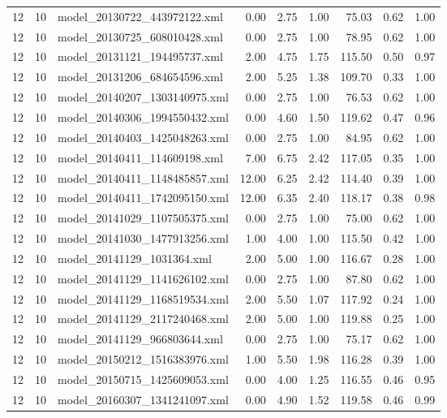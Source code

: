 \begin{table}[ht]
\begin{tabular}{rrlrrrrrr}
   12 &  10 & model\_20130722\_443972122.xml & 0.00 & 2.75 & 1.00 & 75.03 & 0.62 & 1.00 \\ 
   12 &  10 & model\_20130725\_608010428.xml & 0.00 & 2.75 & 1.00 & 78.95 & 0.62 & 1.00 \\ 
   12 &  10 & model\_20131121\_194495737.xml & 2.00 & 4.75 & 1.75 & 115.50 & 0.50 & 0.97 \\ 
   12 &  10 & model\_20131206\_684654596.xml & 2.00 & 5.25 & 1.38 & 109.70 & 0.33 & 1.00 \\ 
   12 &  10 & model\_20140207\_1303140975.xml & 0.00 & 2.75 & 1.00 & 76.53 & 0.62 & 1.00 \\ 
   12 &  10 & model\_20140306\_1994550432.xml & 0.00 & 4.60 & 1.50 & 119.62 & 0.47 & 0.96 \\ 
   12 &  10 & model\_20140403\_1425048263.xml & 0.00 & 2.75 & 1.00 & 84.95 & 0.62 & 1.00 \\ 
   12 &  10 & model\_20140411\_114609198.xml & 7.00 & 6.75 & 2.42 & 117.05 & 0.35 & 1.00 \\ 
   12 &  10 & model\_20140411\_1148485857.xml & 12.00 & 6.25 & 2.42 & 114.40 & 0.39 & 1.00 \\ 
   12 &  10 & model\_20140411\_1742095150.xml & 12.00 & 6.35 & 2.40 & 118.17 & 0.38 & 0.98 \\ 
   12 &  10 & model\_20141029\_1107505375.xml & 0.00 & 2.75 & 1.00 & 75.00 & 0.62 & 1.00 \\ 
   12 &  10 & model\_20141030\_1477913256.xml & 1.00 & 4.00 & 1.00 & 115.50 & 0.42 & 1.00 \\ 
   12 &  10 & model\_20141129\_1031364.xml & 2.00 & 5.00 & 1.00 & 116.67 & 0.28 & 1.00 \\ 
   12 &  10 & model\_20141129\_1141626102.xml & 0.00 & 2.75 & 1.00 & 87.80 & 0.62 & 1.00 \\ 
   12 &  10 & model\_20141129\_1168519534.xml & 2.00 & 5.50 & 1.07 & 117.92 & 0.24 & 1.00 \\ 
   12 &  10 & model\_20141129\_2117240468.xml & 2.00 & 5.00 & 1.00 & 119.88 & 0.25 & 1.00 \\ 
   12 &  10 & model\_20141129\_966803644.xml & 0.00 & 2.75 & 1.00 & 75.17 & 0.62 & 1.00 \\ 
   12 &  10 & model\_20150212\_1516383976.xml & 1.00 & 5.50 & 1.98 & 116.28 & 0.39 & 1.00 \\ 
   12 &  10 & model\_20150715\_1425609053.xml & 0.00 & 4.00 & 1.25 & 116.55 & 0.46 & 0.95 \\ 
   12 &  10 & model\_20160307\_1341241097.xml & 0.00 & 4.90 & 1.52 & 119.58 & 0.46 & 0.99 \\ 

\end{tabular}
\end{table}
